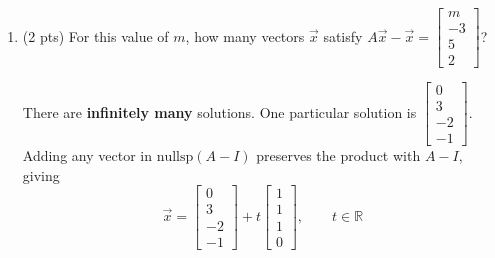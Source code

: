 \documentclass[11pt]{article}
\begin{document}
\begin{prob}[(16 pts)]
\begin{subprob}
\begin{enumerate}[label=(\roman*)]
\vspace{0.7cm}
\begin{solution}
Applying $A$ rearranges the first three components, so their sum does not change. Their changes must therefore sum to zero:
\[
m+(-3)+5=0\quad\Longrightarrow\quad\boxed{m=-2}
\]

The argument above is the intended, efficient technique. The longer way is to multiply out $ (A-I)\vec x $ and match entries:
\[
\begin{bmatrix}x_3-x_1\\x_1-x_2\\x_2-x_3\\-2x_4\end{bmatrix}
=
\begin{bmatrix}m\\-3\\5\\2\end{bmatrix}
\]
The second equation gives $x_2=x_1+3$, and the third gives $x_3=x_2-5=x_1-2$. Substituting into the first equation gives $m=x_3-x_1=-2$.
\end{solution}
\item (2 pts) For this value of $m$, how many vectors $\vec x$ satisfy $A\vec x-\vec x=\begin{bmatrix}m\\-3\\5\\2\end{bmatrix}$?\par\vspace{0.2em}

\begin{solution}
There are \textbf{infinitely many} solutions. One particular solution is $\begin{bmatrix}0\\3\\-2\\-1\end{bmatrix}$. Adding any vector in $\text{nullsp}(A-I)$ preserves the product with $A-I$, giving
\[
\vec x=\begin{bmatrix}0\\3\\-2\\-1\end{bmatrix}
+t\begin{bmatrix}1\\1\\1\\0\end{bmatrix},\qquad t\in\mathbb R
\]
\end{solution}
\end{enumerate}
\end{subprob}
\end{prob}
\newpage
\end{document}
